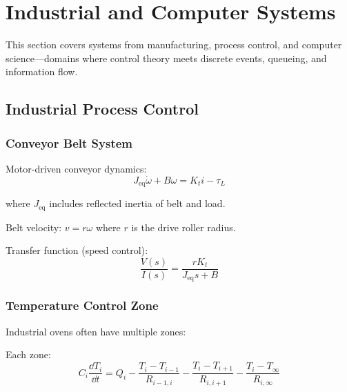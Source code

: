 
\section{Industrial and Computer Systems}
\label{sec:industrial_computer}

This section covers systems from manufacturing, process control, and computer science---domains where control theory meets discrete events, queueing, and information flow.

\subsection{Industrial Process Control}
\label{subsec:industrial_process}

\subsubsection{Conveyor Belt System}



Motor-driven conveyor dynamics:
\begin{equation}
J_{\text{eq}}\dot{\omega} + B\omega = K_t i - \tau_L
\end{equation}

where $J_{\text{eq}}$ includes reflected inertia of belt and load.

Belt velocity: $v = r\omega$ where $r$ is the drive roller radius.

Transfer function (speed control):
\begin{equation}
\frac{V(s)}{I(s)} = \frac{rK_t}{J_{\text{eq}}s + B}
\end{equation}

\subsubsection{Temperature Control Zone}

Industrial ovens often have multiple zones:



Each zone:
\begin{equation}
C_i\frac{\dd T_i}{\dd t} = Q_i - \frac{T_i - T_{i-1}}{R_{i-1,i}} - \frac{T_i - T_{i+1}}{R_{i,i+1}} - \frac{T_i - T_{\infty}}{R_{i,\infty}}
\end{equation}

